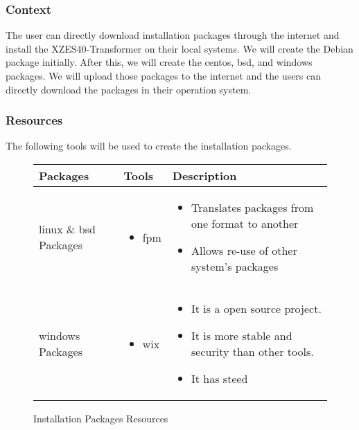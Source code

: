 \subsubsection{Context}

The user can directly download installation packages through the internet and install the XZES40-Transformer on their local systems.
We will create the Debian package initially.
After this, we will create the \gls{centos}, \gls{bsd}, and \gls{windows} packages.
We will upload those packages to the internet and the users can directly download the packages in their operation system.

\subsubsection{Resources}

The following tools will be used to create the installation packages. 
\begin{figure}
\begin{center}                                                                       
    \begin{tabular}{ | p{2.5cm} | p{5cm} | p{5cm} | }
    \hline
      Packages & Tools & Description\\ \hline
      \gls{linux} \& \gls{bsd} Packages  & 
      \begin{itemize}
      \item \gls{fpm}
      \end{itemize}
      & \begin{itemize}
      \item Translates packages from one format to another
      \item Allows re-use of other system's packages
      \end{itemize}
      \\ \hline
      \gls{windows} Packages & 
      \begin{itemize}
      \item \gls{wix}
      \end{itemize}
      & \begin{itemize}
      \item It is a open source project.
      \item It is more stable and security than other tools.
      \item It has steed
      \end{itemize}
      \\ \hline
    \end{tabular}
\end{center}
\caption{Installation Packages Resources}
\end{figure}
